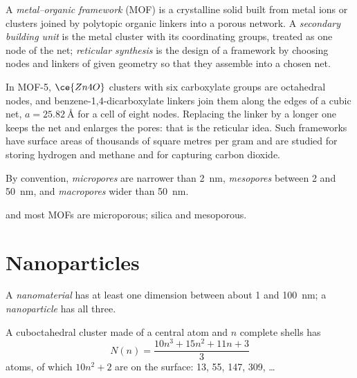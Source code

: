 \begin{definition}\label{def:b3:inorganic-materials:mof}
A \emph{metal--organic framework} (MOF) is a
crystalline solid built from metal ions or clusters joined by polytopic
organic linkers into a porous network. A \emph{secondary building
unit} is the metal cluster with its
coordinating groups, treated as one node of the net; \emph{reticular
synthesis} is the design of a framework by choosing
nodes and linkers of given geometry so that they assemble into a chosen net.
\end{definition}

In MOF-5, $\ce{Zn4O}$ clusters with six carboxylate groups are octahedral nodes,
and benzene-1,4-dicarboxylate linkers join them along the edges of a cubic
net, $a = \qty{25.82}{\angstrom}$ for a cell of eight nodes. Replacing the linker by a longer
one keeps the net and enlarges the pores: that is the reticular idea. Such
frameworks have surface areas of thousands of square metres per gram and are
studied for storing hydrogen and methane and for capturing carbon dioxide.

\begin{definition}\label{def:b3:inorganic-materials:pores}
By convention, \emph{micropores} are narrower than \qty{2}{nm},
\emph{mesopores} between 2 and \qty{50}{nm}, and
\emph{macropores} wider than \qty{50}{nm}.
\end{definition}

 and most MOFs are microporous; silica  and  mesoporous.

\section{Nanoparticles}

\begin{definition}[Nanomaterials]\label{def:b3:inorganic-materials:nano}
A \emph{nanomaterial} has at least one dimension between
about 1 and \qty{100}{nm}; a \emph{nanoparticle} has all
three.
\end{definition}

\begin{proposition}\label{prop:b3:inorganic-materials:magic}
A cuboctahedral cluster made of a central atom and $n$ complete shells has
\[
  N(n) = \frac{10n^3 + 15n^2 + 11n + 3}{3}
\]
atoms, of which $10n^2 + 2$ are on the surface: 13, 55, 147, 309, \dots
\end{proposition}

